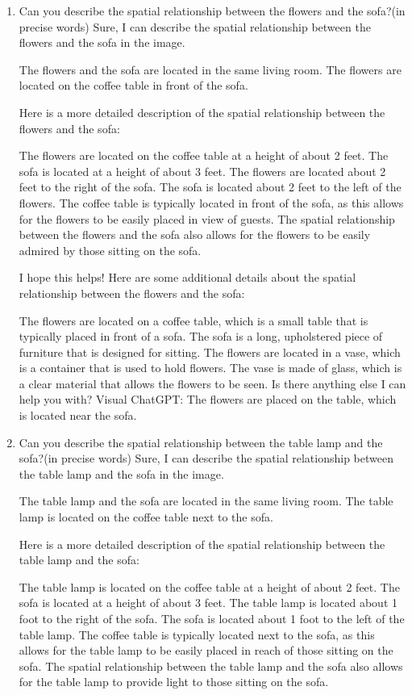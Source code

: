 \begin{enumerate}
    \item Can you describe the spatial relationship between the flowers and the sofa?(in precise words)
    \subitem Sure, I can describe the spatial relationship between the flowers and the sofa in the image.

    The flowers and the sofa are located in the same living room. The flowers are located on the coffee table in front of the sofa.
    
    Here is a more detailed description of the spatial relationship between the flowers and the sofa:
    
    The flowers are located on the coffee table at a height of about 2 feet.
    The sofa is located at a height of about 3 feet.
    The flowers are located about 2 feet to the right of the sofa.
    The sofa is located about 2 feet to the left of the flowers.
    The coffee table is typically located in front of the sofa, as this allows for the flowers to be easily placed in view of guests. The spatial relationship between the flowers and the sofa also allows for the flowers to be easily admired by those sitting on the sofa.
    
    I hope this helps!
    Here are some additional details about the spatial relationship between the flowers and the sofa:

    The flowers are located on a coffee table, which is a small table that is typically placed in front of a sofa.
    The sofa is a long, upholstered piece of furniture that is designed for sitting.
    The flowers are located in a vase, which is a container that is used to hold flowers.
    The vase is made of glass, which is a clear material that allows the flowers to be seen.
    Is there anything else I can help you with?
    \subitem Visual ChatGPT: The flowers are placed on the table, which is located near the sofa.
    \item Can you describe the spatial relationship between the table lamp and the sofa?(in precise words)
    \subitem 
    Sure, I can describe the spatial relationship between the table lamp and the sofa in the image.
    
    The table lamp and the sofa are located in the same living room. The table lamp is located on the coffee table next to the sofa.
    
    Here is a more detailed description of the spatial relationship between the table lamp and the sofa:
    
    The table lamp is located on the coffee table at a height of about 2 feet.
    The sofa is located at a height of about 3 feet.
    The table lamp is located about 1 foot to the right of the sofa.
    The sofa is located about 1 foot to the left of the table lamp.
    The coffee table is typically located next to the sofa, as this allows for the table lamp to be easily placed in reach of those sitting on the sofa. The spatial relationship between the table lamp and the sofa also allows for the table lamp to provide light to those sitting on the sofa.
    

\end{enumerate}
